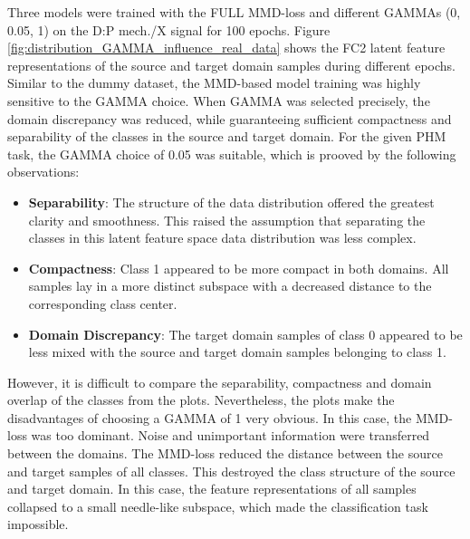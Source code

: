 Three models were trained with the FULL MMD-loss and different GAMMAs (0, 0.05, 1) on the D:P mech./X signal for 100 epochs. Figure \ref{fig:distribution_GAMMA_influence_real_data} 
shows the FC2 latent feature representations of the source and target domain samples during
different epochs. Similar to the dummy dataset, the MMD-based model training was highly sensitive to the GAMMA choice. When GAMMA was selected precisely, the domain discrepancy was reduced, while guaranteeing sufficient compactness and separability of the classes in the source and target domain. For the given PHM task, the GAMMA choice of 0.05 was suitable, which is prooved by the following observations:
\begin{itemize}
    \item \textbf{Separability}: The structure of the data distribution offered the greatest clarity and smoothness. This raised the assumption that separating the classes in this latent feature space data distribution was less complex. 
    \item \textbf{Compactness}: Class 1 appeared to be more compact in both domains. All samples lay in a more distinct subspace with a decreased distance to the corresponding class center.
    \item \textbf{Domain Discrepancy}: The target domain samples of class 0 appeared to be less mixed with the source and target domain samples belonging to class 1. 
\end{itemize}

However, it is difficult to compare the separability, compactness and domain overlap of the classes from the plots. Nevertheless, the plots make the disadvantages of choosing a GAMMA of 1 very obvious. In this case, the MMD-loss was too dominant. Noise and unimportant information were transferred between the domains. The MMD-loss reduced the distance between the source and target samples of all classes. This destroyed the class structure of the source and target domain. In this case, the feature representations of all samples collapsed to a small needle-like subspace, which made the classification task impossible.

